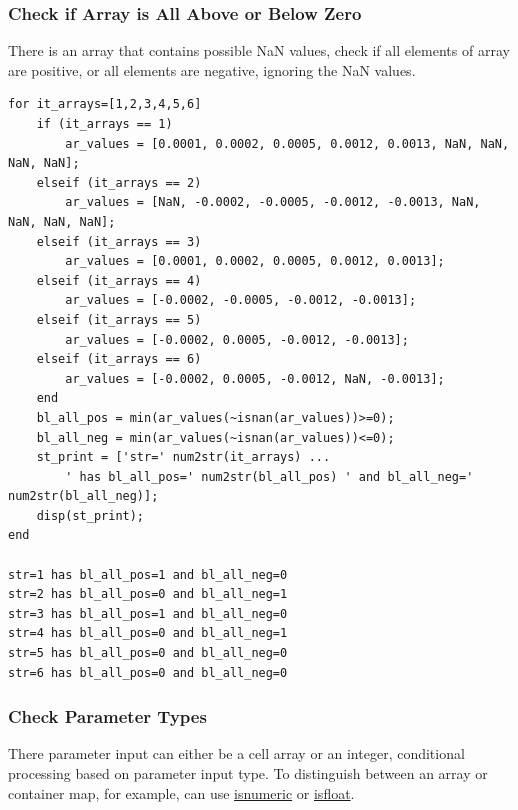 \documentclass[
]{book}
\begin{document}
\hypertarget{check-if-array-is-all-above-or-below-zero}{%
\subsubsection{Check if Array is All Above or Below Zero}\label{check-if-array-is-all-above-or-below-zero}}

There is an array that contains possible NaN values, check if all
elements of array are positive, or all elements are negative, ignoring
the NaN values.

\begin{verbatim}
for it_arrays=[1,2,3,4,5,6]
    if (it_arrays == 1)
        ar_values = [0.0001, 0.0002, 0.0005, 0.0012, 0.0013, NaN, NaN, NaN, NaN];
    elseif (it_arrays == 2)
        ar_values = [NaN, -0.0002, -0.0005, -0.0012, -0.0013, NaN, NaN, NaN, NaN];
    elseif (it_arrays == 3)
        ar_values = [0.0001, 0.0002, 0.0005, 0.0012, 0.0013];
    elseif (it_arrays == 4)
        ar_values = [-0.0002, -0.0005, -0.0012, -0.0013];
    elseif (it_arrays == 5)
        ar_values = [-0.0002, 0.0005, -0.0012, -0.0013];
    elseif (it_arrays == 6)
        ar_values = [-0.0002, 0.0005, -0.0012, NaN, -0.0013];
    end
    bl_all_pos = min(ar_values(~isnan(ar_values))>=0);
    bl_all_neg = min(ar_values(~isnan(ar_values))<=0);
    st_print = ['str=' num2str(it_arrays) ...
        ' has bl_all_pos=' num2str(bl_all_pos) ' and bl_all_neg=' num2str(bl_all_neg)];
    disp(st_print);
end

str=1 has bl_all_pos=1 and bl_all_neg=0
str=2 has bl_all_pos=0 and bl_all_neg=1
str=3 has bl_all_pos=1 and bl_all_neg=0
str=4 has bl_all_pos=0 and bl_all_neg=1
str=5 has bl_all_pos=0 and bl_all_neg=0
str=6 has bl_all_pos=0 and bl_all_neg=0
\end{verbatim}

\hypertarget{check-parameter-types}{%
\subsubsection{Check Parameter Types}\label{check-parameter-types}}

There parameter input can either be a cell array or an integer,
conditional processing based on parameter input type. To distinguish
between an array or container map, for example, can use
\href{https://www.mathworks.com/help/matlab/ref/isnumeric.html}{isnumeric} or
\href{https://www.mathworks.com/help/matlab/ref/isfloat.html}{isfloat}.
\end{document}
